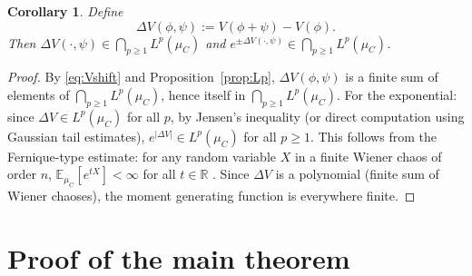 \documentclass[12pt]{article}
\newtheorem{corollary}[theorem]{Corollary}
\newcommand{\R}{\mathbb{R}}
\newcommand{\E}{\mathbb{E}}
\begin{document}
\begin{corollary}\label{cor:DeltaVLp}
Define
\[
  \Delta V(\phi,\psi) := V(\phi+\psi) - V(\phi).
\]
Then $\Delta V(\cdot,\psi)\in\bigcap_{p\ge 1}L^p(\mu_C)$ and
$e^{\pm\Delta V(\cdot,\psi)}\in\bigcap_{p\ge 1}L^p(\mu_C)$.
\end{corollary}

\begin{proof}
By \eqref{eq:Vshift} and Proposition~\ref{prop:Lp}, $\Delta V(\phi,\psi)$ is a finite sum of
elements of $\bigcap_{p\ge 1}L^p(\mu_C)$, hence itself in $\bigcap_{p\ge 1}L^p(\mu_C)$.
For the exponential: since $\Delta V\in L^p(\mu_C)$ for all $p$, by Jensen's inequality
(or direct computation using Gaussian tail estimates),
$e^{|\Delta V|}\in L^p(\mu_C)$ for all $p\ge 1$.  This follows from the
Fernique-type estimate: for any random variable $X$ in a finite Wiener chaos of order $n$,
$\E_{\mu_C}[e^{tX}]<\infty$ for all $t\in\R$ \cite[Theorem~4.7.2]{Janson1997}.  Since
$\Delta V$ is a polynomial (finite sum of Wiener chaoses), the moment generating function is
everywhere finite.
\end{proof}

\section{Proof of the main theorem}
\end{document}
